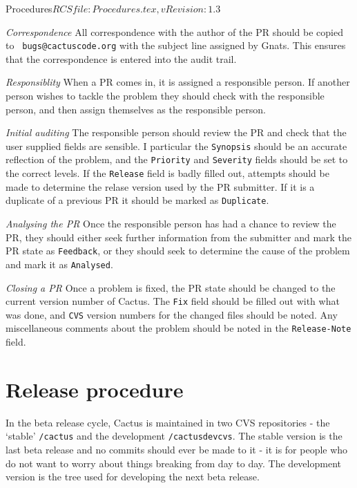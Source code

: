 \begin{cactuspart}{2}{Procedures}{$RCSfile: Procedures.tex,v $}{$Revision: 1.3 $}
\begin{Lentry}
\item[{\em Correspondence}]
All correspondence with the author of the PR should be copied to {\tt
\verb,bugs@cactuscode.org,} with the subject line assigned by Gnats.
This ensures that the correspondence is entered into the audit trail.
\item[{\em Responsiblity}]
When a PR comes in, it is assigned a responsible person.  If another
person wishes to tackle the problem they should check with the
responsible person, and then assign themselves as the responsible
person.
\item[{\em Initial auditing}]
The responsible person should review the PR and check that the user
supplied fields are sensible.  I particular the {\tt Synopsis} should
be an accurate reflection of the problem, and the {\tt Priority} and
{\tt Severity} fields should be set to the correct levels.  If the
{\tt Release} field is badly filled out, attempts should be made to
determine the relase version used by the PR submitter.  If it is a
duplicate of a previous PR it should be marked as {\tt Duplicate}.
\item[{\em Analysing the PR}]
Once the responsible person has had a chance to review the PR, they
should either seek further information from the submitter and mark the 
PR state as {\tt Feedback}, or they should seek to determine the cause 
of the problem and mark it as {\tt Analysed}.
\item[{\em Closing a PR}]
Once a problem is fixed, the PR state should be changed to the current 
version number of Cactus.  The {\tt Fix} field should be filled out
with what was done, and {\tt CVS} version numbers for the changed
files should be noted.  Any miscellaneous comments about the problem
should be noted in the {\tt Release-Note} field.
\end{Lentry}


\chapter{Release procedure}

In the beta release cycle, Cactus is maintained in two CVS
repositories - the `stable' \verb./cactus. and the development
\verb./cactusdevcvs..  The stable version is the last beta release and 
no commits should ever be made to it - it is for people who do not
want to worry about things breaking from day to day.  The development
version is the tree used for developing the next beta release.


\end{cactuspart}
